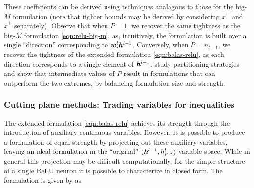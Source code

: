 These coefficients can be derived using techniques analagous to those for the big-$M$ formulation (note that tighter bounds may be derived by considering $\hat{x}^-$ and $\hat{x}^+$ separately). 
Observe that when $P=1$, we recover the same tightness as the big-$M$ formulation \eqref{eqn:relu-big-m}, as, intuitively, the formulation is built over a single ``direction'' corresponding to ${\bm{w}}_i^l {\bm{h}}^{l-1}$. Conversely, when $P=n_{l-1}$, we recover the tightness of the extended formulation \eqref{eqn:balas-relu}, as each direction corresponds to a single element of ${\bm{h}}^{l-1}$.
\cite{tsay2021partition} study partitioning strategies and show that intermediate values of $P$ result in formulations that can outperform the two extremes, by balancing formulation size and strength.


\subsubsection{Cutting plane methods: Trading variables for inequalities} \label{sec:strengthening-inequalities}
The extended formulation \eqref{eqn:balas-relu} achieves its strength through the introduction of auxiliary continuous variables. However, it is possible to produce a formulation of equal strength by projecting out these auxiliary variables, leaving an ideal formulation in the ``original'' $({\bm{h}}^{l-1},h^l_i,z)$ variable space. While in general this projection may be difficult computationally, for the simple structure of a single ReLU neuron it is possible to characterize in closed form. The formulation is given by \cite{anderson2020strong,anderson2019strong} as
